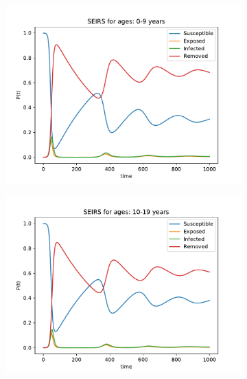\begin{figure}[H]
\centering
\begin{subfigure}{0.40\textwidth}
\includegraphics[width = \textwidth]{../fig/SEIRS_0-9_n.pdf}
\caption{\protect}
\end{subfigure}
\begin{subfigure}{0.40\textwidth}
\includegraphics[width = \textwidth]{../fig/SEIRS_10-19_n.pdf}
\caption{\protect}
\end{subfigure}
\begin{subfigure}{0.40\textwidth}

\end{subfigure}
\end{figure}
